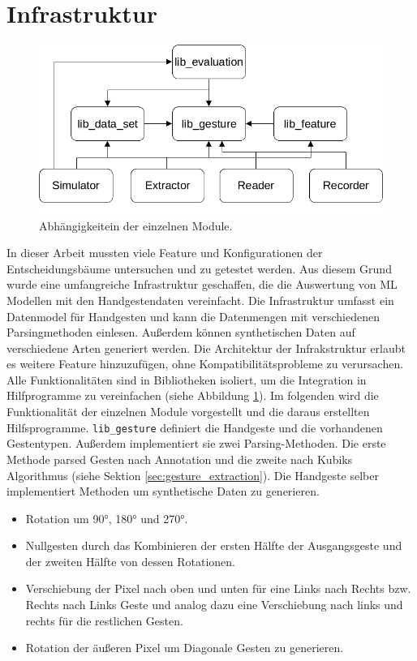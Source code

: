 \section{Infrastruktur}
\label{sec:recorder}
\begin{figure}
    \centering
    \includegraphics[width=0.75\linewidth]{images/architecture_overview.jpg}
    \caption{Abhängigkeitein der einzelnen Module.}
    \label{fig:architecture_overview}
\end{figure}
In dieser Arbeit mussten viele Feature und Konfigurationen der Entscheidungsbäume untersuchen und zu getestet werden. Aus diesem Grund wurde eine umfangreiche Infrastruktur geschaffen, die die
Auswertung von ML Modellen mit den Handgestendaten vereinfacht. Die Infrastruktur umfasst ein Datenmodel für Handgesten und kann die Datenmengen mit verschiedenen Parsingmethoden einlesen.
\newline
\newline
Außerdem können synthetischen Daten auf verschiedene Arten generiert werden. Die Architektur der Infrakstruktur erlaubt es weitere Feature hinzuzufügen, ohne Kompatibilitätsprobleme zu verursachen.
Alle Funktionalitäten sind in Bibliotheken isoliert, um die Integration in Hilfprogramme zu vereinfachen (siehe Abbildung \ref{fig:architecture_overview}).
\newline
\newline
Im folgenden wird die Funktionalität der einzelnen Module vorgestellt und die daraus erstellten Hilfsprogramme.
\newline
\newline
\texttt{lib\_gesture} definiert die Handgeste und die vorhandenen Gestentypen. Außerdem implementiert sie zwei Parsing-Methoden. Die erste Methode parsed Gesten nach Annotation und die
zweite nach Kubiks Algorithmus (siehe Sektion \ref{sec:gesture_extraction}). Die Handgeste selber implementiert Methoden um synthetische Daten zu generieren.
\begin{itemize}
    \item Rotation um 90°, 180° und 270°.
    \item Nullgesten durch das Kombinieren der ersten Hälfte der Ausgangsgeste und der zweiten Hälfte von dessen Rotationen.
    \item Verschiebung der Pixel nach oben und unten für eine Links nach Rechts bzw. Rechts nach Links Geste und analog dazu eine Verschiebung nach links und rechts für die restlichen Gesten.
    \item Rotation der äußeren Pixel um Diagonale Gesten zu generieren.
\end{itemize}
